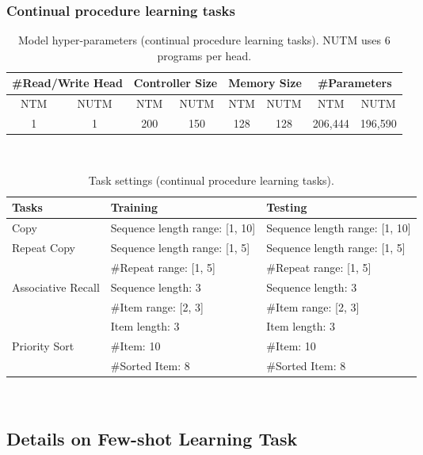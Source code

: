 \documentclass[english]{article}
\providecommand{\tabularnewline}{\\}
\begin{document}
\subsubsection{Continual procedure learning tasks}

\begin{table}[H]
\begin{centering}
\begin{tabular}{cccccccc}
\hline 
\multicolumn{2}{c}{\#Read/Write Head} & \multicolumn{2}{c}{Controller Size} & \multicolumn{2}{c}{Memory Size} & \multicolumn{2}{c}{\#Parameters}\tabularnewline
\hline 
NTM & NUTM & NTM & NUTM & NTM & NUTM & NTM & NUTM\tabularnewline
\hline 
1 & 1 & 200 & 150 & 128 & 128 & 206,444 & 196,590\tabularnewline
\hline 
\end{tabular}
\par\end{centering}
~

\caption{Model hyper-parameters (continual procedure learning tasks). NUTM
uses 6 programs per head.}
\end{table}
\begin{table}[H]
\begin{centering}
\begin{tabular}{lll}
\hline 
\multirow{1}{*}{Tasks} & Training & Testing\tabularnewline
\hline 
Copy & Sequence length range: {[}1, 10{]} & Sequence length range: {[}1, 10{]}\tabularnewline
\hline 
\multirow{2}{*}{Repeat Copy} & Sequence length range: {[}1, 5{]} & Sequence length range: {[}1, 5{]}\tabularnewline
 & \#Repeat range: {[}1, 5{]} & \#Repeat range: {[}1, 5{]}\tabularnewline
\hline 
\multirow{3}{*}{Associative Recall} & Sequence length: 3 & Sequence length: 3\tabularnewline
 & \#Item range: {[}2, 3{]} & \#Item range: {[}2, 3{]}\tabularnewline
 & Item length: 3 & Item length: 3\tabularnewline
\hline 
\multirow{2}{*}{Priority Sort} & \#Item: 10 & \#Item: 10\tabularnewline
 & \#Sorted Item: 8 & \#Sorted Item: 8\tabularnewline
\hline 
\end{tabular}
\par\end{centering}
~

\caption{Task settings (continual procedure learning tasks).}
\end{table}

\subsection{Details on Few-shot Learning Task\label{subsec:Details-on-Few-shot}}
\end{document}

